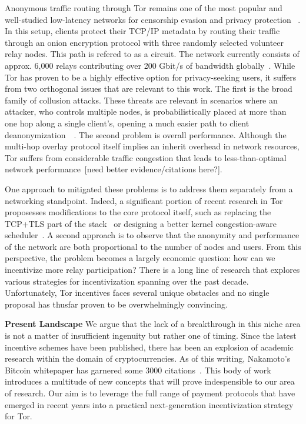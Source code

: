 Anonymous traffic routing through Tor remains one of the most popular and
well-studied low-latency networks for censorship evasion and privacy protection
~\cite{dingledine2004tor}. In this setup, clients protect their TCP/IP metadata
by routing their traffic through an onion encryption protocol with three
randomly selected volunteer relay nodes. This path is refered to as a
circuit. The network currently consists of approx. 6,000 relays contributing
over 200 Gbit/s of bandwidth globally~\cite{portal2018tormetrics}. While Tor has
proven to be a highly effective option for privacy-seeking users, it suffers
from two orthogonal issues that are relevant to this work. The first is the
broad family of collusion attacks. These threats are relevant in scenarios where
an attacker, who controls multiple nodes, is probabilistically placed at more
than one hop along a single client's, opening a much easier path to client
deanonymization~\cite{wright2004predecessor}~\cite{murdoch2005low}. The second
problem is overall performance. Although the multi-hop overlay protocol itself
implies an inherit overhead in network resources, Tor suffers from considerable
traffic congestion that leads to less-than-optimal network
performance~\cite{portal2018tormetrics}[need better evidence/citations here?].

One approach to mitigated these problems is to address them separately from a
networking standpoint. Indeed, a significant portion of recent research in Tor
proposesses modifications to the core protocol itself, such as replacing the
TCP+TLS part of the stack~\cite{} or designing a better kernel congestion-aware
scheduler~\cite{jansen2014never}. A second approach is to observe that the
anonymity and performance of the network are both proportional to the number of
nodes and users. From this perspective, the problem becomes a largely economic
question: how can we incentivize more relay participation?  There is a long line
of research that explores various strategies for incentivization spanning over
the past decade. Unfortunately, Tor incentives faces several unique
obstacles and no single proposal has thusfar proven to be overwhelmingly
convincing.

\textbf{Present Landscape} We argue that the lack of a breakthrough in this
niche area is not a matter of insufficient ingenuity but rather one of
timing. Since the latest incentive schemes have been published, there has been
an explosion of academic research within the domain of cryptocurrencies. As of
this writing, Nakamoto's Bitcoin whitepaper has garnered some 3000
citations~\cite{nakamoto2008bitcoin}. This body of work introduces a multitude
of new concepts that will prove indespensible to our area of research. Our aim
is to leverage the full range of payment protocols that have emerged in recent
years into a practical next-generation incentivization strategy for Tor.

